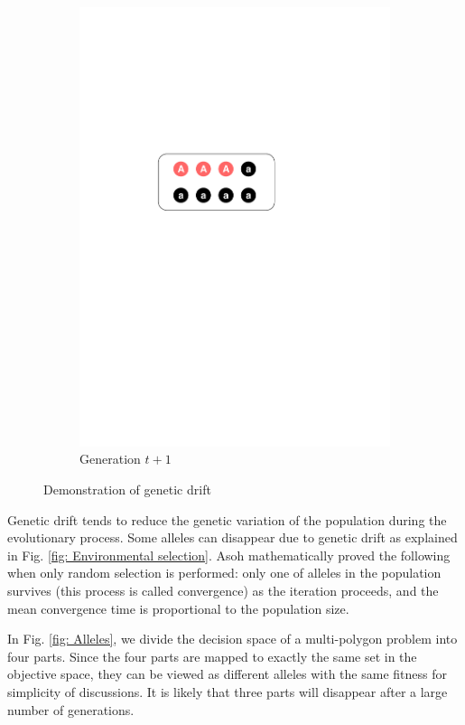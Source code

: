 \documentclass[conference]{IEEEtran}
\begin{document}
\begin{figure}[htbp]
\begin{subfigure}[b]{.24\textwidth}
		\includegraphics[width=\linewidth]{Section2/Generation_t1}
		\caption{Generation $t+1$}
	\end{subfigure}
	\caption{Demonstration of genetic drift}
	\label{fig:Genetic drift demo}
\end{figure}

Genetic drift tends to reduce the genetic variation of the population during the evolutionary process. Some alleles can disappear due to genetic drift as explained in Fig. \ref{fig: Environmental selection}. Asoh\cite{asoh1994mean} mathematically proved the following when only random selection is performed: only one of alleles in the population survives (this process is called convergence) as the iteration proceeds, and the mean convergence time is proportional to the population size. 

In Fig. \ref{fig: Alleles}, we divide the decision space of a multi-polygon problem into four parts. Since the four parts are mapped to exactly the same set in the objective space, they can be viewed as different alleles with the same fitness for simplicity of discussions. It is likely that three parts will disappear after a large number of generations.
\end{document}
